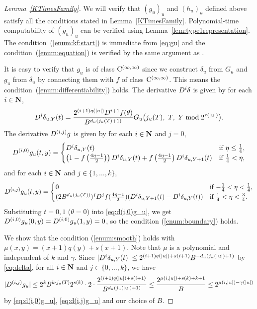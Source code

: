 \begin{proof}[Lemma~\ref{KTimesFamily}]
We will verify that $(g_u)_u$ and $(h_u)_u$ defined above satisfy all the conditions stated in Lemma~\ref{KTimesFamily}.
Polynomial-time computability of $(g_u)_u$ can be verified using Lemma~\ref{lem:type1representation}.
The condition~(\ref{enum:kf:start}) is immediate from \eqref{eq:gu} and
the condition~(\ref{enum:equation}) is verified by the same argument as
\cite[Lemma 4.1]{kawamura2010lipschitz}.

It is easy to verify that $g_u$ is of class $\mathrm C^{(\infty, \infty)}$ 
since we construct $\delta_u$ from $G_u$ and $g_u$ from $\delta_u$ by connecting them with $f$ of class $\mathrm C^{(\infty, \infty)}$.
This means the condition~(\ref{enum:differentiability}) holds.
The derivative $D^i \delta$ is given by for each $i \in \mathbf N$,
\begin{equation}
    D^i \delta_{u,Y}(t) 
    = \frac{2^{(i+1)q(|u|)} D^{i+1}f(\theta)}{B^{d_u(j_u(T)+1)}}
    G_u\bigl( j_u(T),\ T,\ Y \bmod 2^{r(|u|)} \bigr).
\end{equation}
The derivative $D^{(i,j)} g$ is given by for each $i \in \mathbf N$ and $j=0$,
\begin{equation}
     D^{(i, 0)} g_u(t, y)
     = \begin{cases}
 	D^i \delta_{u, Y}(t) 
	& \text{if} \ \eta \le \frac 1 4, 
	\\
	\left( 1-f \left(\frac{4\eta-1}{2}\right)\right) 
	D^i \delta_{u, Y}(t)
	+ f \left(\frac{4\eta-1}{2}\right) D^i \delta_{u,Y+1}(t) 
	& \text{if} \ \frac 1 4 < \eta,
       \end{cases} \label{eq:d(i,0)g_u}
\end{equation}
and for each $i \in \mathbf N$ and $j \in \{1, \dots, k\}$,
  \begin{equation} \label{eq:d(i,j)g_u}
    D^{(i, j)} g_u(t, y)
     = \begin{cases}
	0 & \text{if} \ {-\frac 1 4} < \eta < \frac 1 4, \\
	(2B^{d_u(j_u(T))})^j D^j f(\frac{4\eta - 1}2)
	(D^i \delta_{u,Y+1}(t)-D^i \delta_{u, Y}(t)) 
	& \text{if} \ \frac 1 4 < \eta < \frac 3 4.
       \end{cases}
  \end{equation}
Substituting $t = 0, 1$ ($\theta = 0$) into \eqref{eq:d(i,0)g_u},
we get $D^{(i, 0)} g_u(0,y) = D^{(i, 0)} g_u(1,y) = 0$, 
so the condition (\ref{enum:boundary}) holds.

We show that the condition (\ref{enum:smooth}) holds with $\mu(x, y) = (x+1)q(y) + s(x+1)$.
Note that $\mu$ is a polynomial and independent of $k$ and $\gamma$.
Since $|D^i \delta_{u,Y}(t)| \le 2^{(i+1)q(|u|) + s(i+1)}B^{-d_u(j_u(|u|)+1)}$ by \eqref{eq:delta}, for all $i \in \mathbf N$ and $j \in \{0, \dots, k\}$, we have
 \begin{equation}
  |D^{(i,j)} g_u| 
   \le 
   2^k B^{k \cdot j_u(T)} 2^{s(k)} \cdot 2 \cdot 
   \frac{2^{(i+1)q(|u|) + s(i+1)}}{B^{d_u(j_u(|u|)+1)}} 
   \le
   \frac{2^{\mu(i, |u|) + s(k) + k + 1}}{B}
   \le
   2^{\mu(i, |u|) - \gamma(|u|)}
 \end{equation}
by \eqref{eq:d(i,0)g_u}, \eqref{eq:d(i,j)g_u} and our choice of $B$.


\end{proof}
